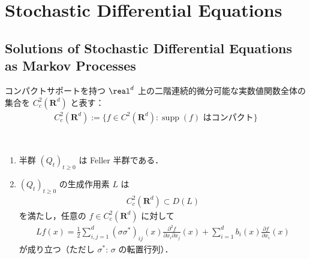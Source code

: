 \documentclass{jsarticle}
\title{}
\author{}
\date{
}
\begin{document}
\setcounter{section}{7}
\section{Stochastic Differential Equations}
\setcounter{subsection}{2}
\subsection{Solutions of Stochastic Differential Equations as Markov Processes}

コンパクトサポートを持つ $\real^d$ 上の二階連続的微分可能な実数値関数全体の集合を $C_c^2(\mathbf{R}^d)$ と表す：
\begin{align}
    C_c^2(\mathbf{R}^d)
    := \{f\in C^2(\mathbf{R}^d):\operatorname{supp}(f)\text{ はコンパクト}\}
\end{align}

\setcounter{thm}{6}
\begin{screen}
    \begin{thm}\label{thm:807}~
        \begin{enumerate}[label=(\arabic*)]
            \item
            半群 $(Q_t)_{t\ge0}$ は Feller 半群である．
            \item
            $(Q_t)_{t\ge0}$ の生成作用素 $L$ は
            \begin{align}
                C_c^2(\mathbf{R}^d)
                \subset D(L)
            \end{align}
            を満たし，任意の $f\in C_c^2(\mathbf{R}^d)$ に対して
            \begin{align}
                Lf(x)
                = \frac{1}{2}\sum_{i, j=1}^{d}(\sigma\sigma^{\ast})_{ij}(x)\frac{\partial^{2}f}{\partial x_{i}\partial x_{j}}(x)
                + \sum_{i=1}^{d}b_{i}(x)\frac{\partial f}{\partial x_{i}}(x)
            \end{align}
            が成り立つ（ただし $\sigma^{\ast}$: $\sigma$ の転置行列）．
        \end{enumerate}
    \end{thm}
\end{screen}
\end{document}
